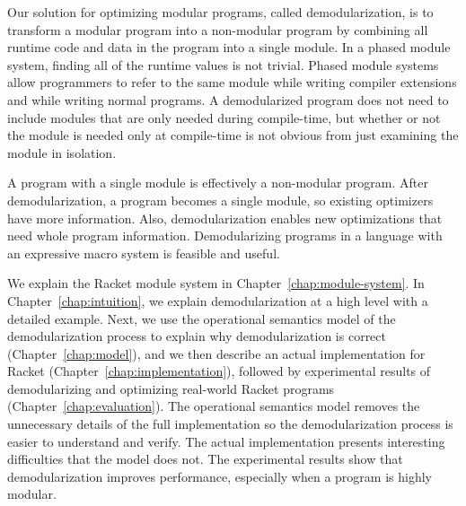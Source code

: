 Our solution for optimizing modular programs, called demodularization, is to transform a modular program into a non-modular program by combining all runtime code and data in the program into a single module.
In a phased module system, finding all of the runtime values is not trivial.
Phased module systems allow programmers to refer to the same module while writing compiler extensions and while writing normal programs.
A demodularized program does not need to include modules that are only needed during compile-time, but whether or not the module is needed only at compile-time is not obvious from just examining the module in isolation. 

A program with a single module is effectively a non-modular program. 
After demodularization, a program becomes a single module, so existing optimizers have more information. 
Also, demodularization enables new optimizations that need whole program information. 
Demodularizing programs in a language with an expressive macro system is feasible and useful.

We explain the Racket module system in Chapter~\ref{chap:module-system}. In Chapter~\ref{chap:intuition}, we explain demodularization at a high level with a detailed example.
Next, we use the operational semantics model of the demodularization process to explain why demodularization is correct (Chapter~\ref{chap:model}), and we then describe an actual implementation for Racket (Chapter~\ref{chap:implementation}), followed by experimental results of demodularizing and optimizing real-world Racket programs (Chapter~\ref{chap:evaluation}). 
The operational semantics model removes the unnecessary details of the full implementation so the demodularization process is easier to understand and verify. 
The actual implementation presents interesting difficulties that the model does not.
The experimental results show that demodularization improves performance, especially when a program is highly modular. 
